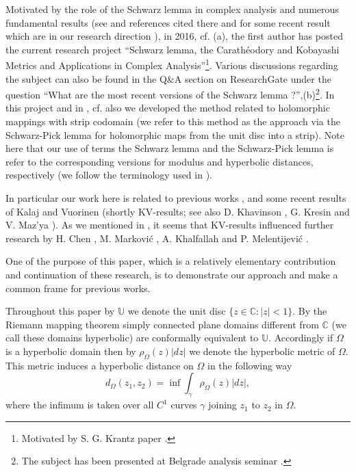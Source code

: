 \documentclass{amsart}
\begin{document}
Motivated by the role of the Schwarz lemma in complex analysis and
numerous fundamental results (see \cite{Ahl,osserman,krantz,MMSchw_Kob} and
 references cited there and for some recent result which are in our
research  direction \cite{AzerOr0,kavu,Khal,MMar,zhu}), in 2016, cf.
\cite{RgSchw1}(a), the first author has posted the current research project \enquote{Schwarz lemma, the Carath\'{e}odory and Kobayashi Metrics and Applications in Complex Analysis}\footnote{Motivated by  S. G. Krantz  paper \cite{krantz}.}.  Various discussions regarding the subject can also  be found  in the Q\&A section on ResearchGate under the question \enquote{What are the most recent versions of the Schwarz lemma ?},\cite{RgSchw1}(b)\footnote{The subject has been presented at Belgrade analysis seminar \cite{Bg_sem}.}. In this project  and  in  \cite{MMSchw_Kob}, cf. also \cite{kavu} we developed  the method  related to  holomorphic mappings with strip codomain (we refer to this method as  the approach  via the Schwarz-Pick lemma for holomorphic maps from the unit disc into a strip). Note here that our use of terms the Schwarz lemma and the Schwarz-Pick lemma is refer to the corresponding   versions for modulus and hyperbolic distances, respectively (we follow the terminology used in \cite{BeardonMinda}).



In particular  our work here  is related  to  previous  works   \cite{mat2,MaK},  and some recent results of Kalaj and  Vuorinen \cite{kavu} (shortly KV-results; see also D. Khavinson  \cite{Khav}, G. Kresin and V. Maz'ya \cite{Maz}).
As we mentioned in \cite{MMSchw_Kob}, it seems that  KV-results  influenced  further  research by H. Chen \cite{hhChen}, M. Markovi\'c \cite{MMar}, A. Khalfallah \cite{Khal} and P. Melentijevi\'c \cite{pmel}.

One of the purpose  of this paper, which  is a relatively elementary contribution  and  continuation of these research, is to demonstrate our approach and make a common frame for previous works.

Throughout this paper by $\mathbb{U}$ we denote the unit disc $\{z\in\mathbb{C}:|z|<1\}$. By the Riemann mapping theorem simply connected plane domains different from  $\mathbb{C}$ (we call these domains hyperbolic) are conformally equivalent to $\mathbb{U}$. Accordingly if $\Omega$ is a hyperbolic domain then by $\rho_{\Omega}(z)|dz|$ we denote the hyperbolic metric of $\Omega$. This metric induces a hyperbolic distance on $\Omega$ in the following way
\begin{equation*}
    d_{\Omega}(z_1,z_2)=\inf\int_{\gamma}\rho_{\Omega}(z)|dz|,
\end{equation*}
where the infimum is taken over all $C^1$ curves $\gamma$ joining $z_1$ to $z_2$ in $\Omega$.
\end{document}

